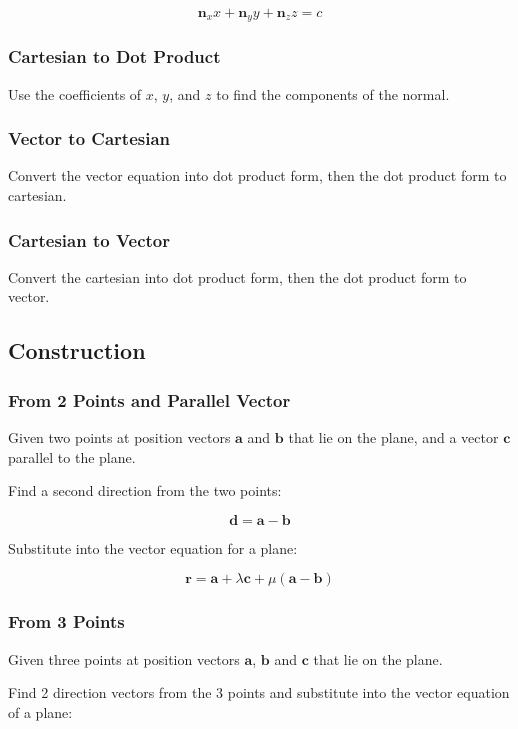 \documentclass[a4paper,11pt]{report}
\newcommand{\bb}{\boldsymbol}
\begin{document}
$$
\bb{n}_x x + \bb{n}_y y + \bb{n}_z z = c
$$

\subsubsection{Cartesian to Dot Product}

Use the coefficients of $x$, $y$, and $z$ to find the components of the normal.

\subsubsection{Vector to Cartesian}

Convert the vector equation into dot product form, then the dot product form
to cartesian.

\subsubsection{Cartesian to Vector}

Convert the cartesian into dot product form, then the dot product form to
vector.

\subsection{Construction}

\subsubsection{From 2 Points and Parallel Vector}

Given two points at position vectors $\bb{a}$ and $\bb{b}$ that lie on the
plane, and a vector $\bb{c}$ parallel to the plane.

Find a second direction from the two points:

$$
\bb{d} = \bb{a} - \bb{b}
$$

Substitute into the vector equation for a plane:

$$
\bb{r} = \bb{a} + \lambda \bb{c} + \mu (\bb{a} - \bb{b})
$$

\subsubsection{From 3 Points}

Given three points at position vectors $\bb{a}$, $\bb{b}$ and $\bb{c}$ that lie
on the plane.

Find 2 direction vectors from the 3 points and substitute into the vector
equation of a plane:
\end{document}
